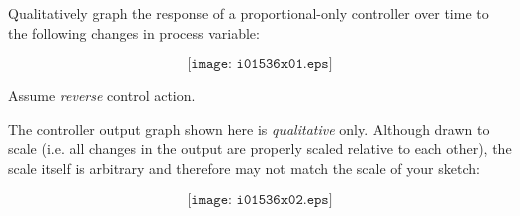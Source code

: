 

Qualitatively graph the response of a proportional-only controller over time to the following changes in process variable:

$$\texttt{[image: i01536x01.eps]}$$

Assume {\it reverse} control action.
 






The controller output graph shown here is {\it qualitative} only.  Although drawn to scale (i.e. all changes in the output are properly scaled relative to each other), the scale itself is arbitrary and therefore may not match the scale of your sketch:

$$\texttt{[image: i01536x02.eps]}$$












